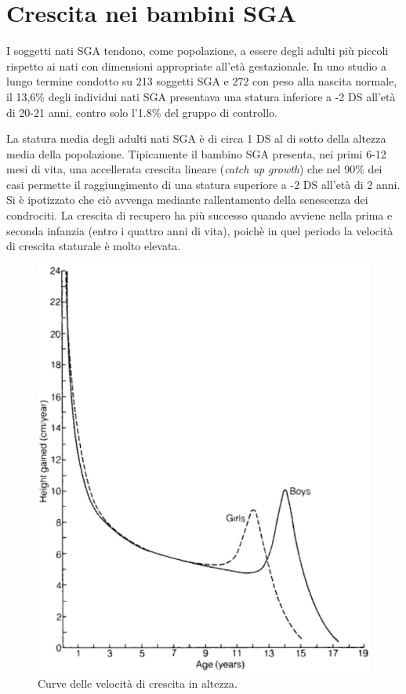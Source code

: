 \section{Crescita nei bambini SGA}

I soggetti nati SGA tendono, come popolazione, a essere degli adulti più piccoli
rispetto ai nati con dimensioni appropriate all'età gestazionale. In uno studio
a lungo termine condotto su 213 soggetti SGA e 272 con peso alla nascita normale, il 
13,6\% degli individui nati SGA presentava una statura inferiore a -2 DS all'età di
20-21 anni, contro solo l'1.8\% del gruppo di controllo.\cite{leger1997reduced}

La statura media degli adulti nati SGA è di circa 1 DS al di sotto della altezza 
media della popolazione. Tipicamente il bambino SGA presenta, nei primi 6-12 mesi
di vita, una accellerata crescita lineare (\textit{catch up growth}) che nel 90\%
dei casi permette il raggiungimento di una statura superiore a -2 DS all'età di
2 anni\cite{karlberg1995growth}.
Si è ipotizzato che ciò avvenga mediante rallentamento della senescenza dei condrociti.\cite{gafni2001catch}
La crescita di recupero ha più successo quando avviene nella prima e seconda infanzia (entro i quattro anni di vita), poichè in quel periodo la velocità di crescita staturale è molto elevata. %

\begin{figure}[!h]
  \begin{center}
      \includegraphics[scale=0.40]{grafici/curva-velocita} %
  \end{center}
  \caption{Curve delle velocità di crescita in altezza.}
  \label{fig:VelocitaCrescita}
\end{figure}

